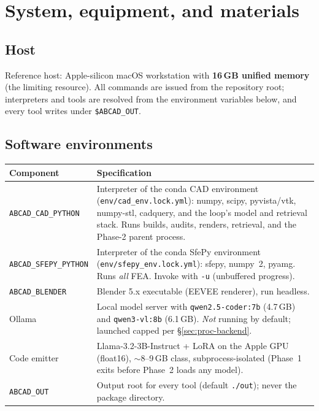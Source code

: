 \documentclass[11pt]{article}
\begin{document}
\section{System, equipment, and materials}\label{sec:equipment}
\subsection{Host}
Reference host: Apple-silicon macOS workstation with \textbf{16\,GB unified memory} (the limiting
resource). All commands are issued from the repository root; interpreters and tools are resolved from
the environment variables below, and every tool writes under \texttt{\$ABCAD\_OUT}.

\subsection{Software environments}
\begin{tabularx}{\linewidth}{@{}lX@{}}
\toprule
Component & Specification \\
\midrule
\texttt{ABCAD\_CAD\_PYTHON} & Interpreter of the conda CAD environment (\texttt{env/cad\_env.lock.yml}):
numpy, scipy, pyvista/vtk, numpy-stl, cadquery, and the loop's model and retrieval stack. Runs builds,
audits, renders, retrieval, and the Phase-2 parent process. \\
\texttt{ABCAD\_SFEPY\_PYTHON} & Interpreter of the conda SfePy environment (\texttt{env/sfepy\_env.lock.yml}):
sfepy, numpy~2, pyamg. Runs \emph{all} FEA. Invoke with \texttt{-u} (unbuffered progress). \\
\texttt{ABCAD\_BLENDER} & Blender 5.x executable (EEVEE renderer), run headless. \\
Ollama & Local model server with \texttt{qwen2.5-coder:7b} (4.7\,GB) and \texttt{qwen3-vl:8b} (6.1\,GB).
\emph{Not} running by default; launched capped per \S\ref{sec:proc-backend}. \\
Code emitter & Llama-3.2-3B-Instruct + LoRA on the Apple GPU (float16), $\sim$8--9\,GB class,
subprocess-isolated (Phase~1 exits before Phase~2 loads any model). \\
\texttt{ABCAD\_OUT} & Output root for every tool (default \texttt{./out}); never the package directory. \\
\bottomrule
\end{tabularx}
\end{document}
